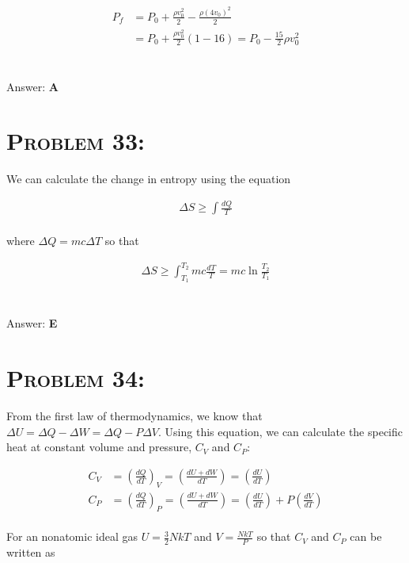 \documentclass{article}
\begin{document}
\begin{align}
P_{f} &= P_{0} + \frac{\rho v_{0}^{2}}{2}  - \frac{\rho (4v_{0})^{2}}{2}\nonumber\\
&= P_{0} +\frac{\rho v_{0}^{2}}{2}\left(1-16\right)= \boxed{P_{0} -\frac{15}{2}\rho v_{0}^{2}}\nonumber
\end{align}
\\\\
Answer: \textbf{\textcolor{ProcessBlue}A}\\


\section{\textsc{Problem 33:}} We can calculate the change in entropy using the equation

\begin{align}
\Delta S \geq \int \frac{d Q}{T}
\end{align}
\\
where $\Delta Q = mc \Delta T$ so that

\begin{align}
\Delta S \geq \int_{T_{1}}^{T_{2}} mc\frac{dT}{T} = \boxed{mc \ln{\frac{T_{2}}{T_{1}}}}\nonumber
\end{align}
\\\\
Answer: \textbf{\textcolor{ProcessBlue}E}\\


\section{\textsc{Problem 34:}} From the first law of thermodynamics, we know that $\Delta U = \Delta Q - \Delta W = \Delta Q - P\Delta V$. Using this equation, we can calculate the specific heat at constant volume and pressure, $C_{V}$ and $C_{P}$:

\begin{align}
C_{V} &= \left(\frac{d Q}{d T}\right)_{V} = \left(\frac{d U + dW}{d T}\right) = \left(\frac{d U}{d T}\right)\\
C_{P} &= \left(\frac{d Q}{d T}\right)_{P} = \left(\frac{d U + dW}{d T}\right) = \left(\frac{d U}{d T}\right) + P\left(\frac{d V}{d T}\right)
\end{align}
\\
For an nonatomic ideal gas $U = \frac{3}{2}NkT$ and $V= \frac{NkT}{P}$ so that $C_{V}$ and $C_{P}$ can be written as
\end{document}
